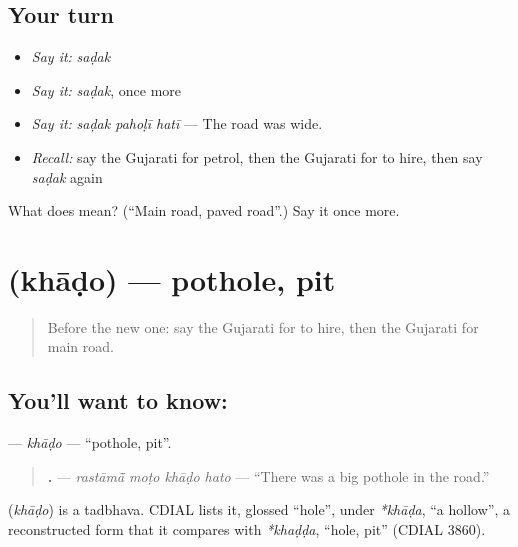 \subsection*{Your turn}
\begin{itemize}
\raggedright
  \item \emph{Say it:} \emph{saḍak}
  \item \emph{Say it:} \emph{saḍak}, once more
  \item \emph{Say it:} \emph{saḍak pahoḷī hatī} — The road was wide.
  \item \emph{Recall:} say the Gujarati for petrol, then the Gujarati for to hire, then say \emph{saḍak} again
\end{itemize}

\begin{tcolorbox}[breakable,colback=teal!4,colframe=teal!35!black,title={Before you move on}]
What does  mean? (\textquotedblleft{}Main road, paved road\textquotedblright{}.) Say it once more.
\end{tcolorbox}
\section[\texorpdfstring{\gu{ખાડો} (khāḍo)}{ખાડો (khāḍo)}]{ (khāḍo) — pothole, pit}

\label{lesson:GU-C208-khado}



\begin{quote}
Before the new one: say the Gujarati for to hire, then the Gujarati for main road.
\end{quote}

\subsection*{You'll want to know: }
\textbf{} — \emph{khāḍo} — \textquotedblleft{}pothole, pit\textquotedblright{}.

\begin{quote}
\textbf{   .} — \emph{rastāmā̃ moṭo khāḍo hato} — \textquotedblleft{}There was a big pothole in the road.\textquotedblright{}
\end{quote}

\begin{cousinweb}
\textbf{} (\emph{khāḍo}) is a tadbhava. CDIAL lists it, glossed \textquotedblleft{}hole\textquotedblright{}, under \emph{*khāḍa}, \textquotedblleft{}a hollow\textquotedblright{}, a reconstructed form that it compares with \emph{*khaḍḍa}, \textquotedblleft{}hole, pit\textquotedblright{} (CDIAL 3860).
\end{cousinweb}

